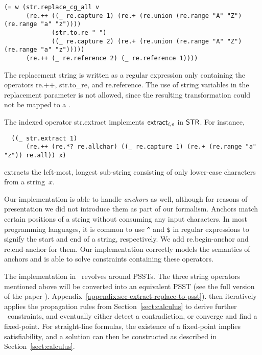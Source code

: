 {\small
\begin{verbatim}
(= w (str.replace_cg_all v
      (re.++ ((_ re.capture 1) (re.+ (re.union (re.range "A" "Z") (re.range "a" "z"))))
             (str.to.re " ") 
             ((_ re.capture 2) (re.+ (re.union (re.range "A" "Z") (re.range "a" "z")))))
      (re.++ (_ re.reference 2) (_ re.reference 1))))
\end{verbatim}
}

The replacement string is written as a regular expression only
containing the operators {\sf re.++}, {\sf str.to\_re}, and {\sf
  re.reference}. The use of string variables in the replacement
parameter is not allowed, since the resulting transformation could
not be mapped to a \PSST.

The indexed operator {\sf str.extract} implements $\mathsf{extract}_{i, e}$ in
$\mathsf{STR}$. For instance,

{\small
\begin{verbatim}
  ((_ str.extract 1)
      (re.++ (re.*? re.allchar) ((_ re.capture 1) (re.+ (re.range "a" "z")) re.all)) x)
\end{verbatim}
}

\noindent
extracts the left-most, longest sub-string consisting of only lower-case
characters from a string~$x$.

Our implementation is able to handle \textit{anchors} as well,
although for reasons of presentation we did not introduce them as part
of our formalism. Anchors match certain
positions of a string without consuming any input characters. In most
programming languages, it is common to use \verb!^!
and
\verb!$! in regular expressions to signify the start and end of a
string, respectively. We add \textsf{re.begin-anchor} and
\textsf{re.end-anchor} for them. Our implementation correctly models
the semantics of anchors and is able to solve constraints containing
these operators.

The implementation in \ostrich\ revolves around PSSTs. The three
string operators mentioned above will be converted into an equivalent
PSST (see \ifproceeding the full version of the paper \cite{popl22-full}).
\else Appendix~\ref{appendix:sec-extract-replace-to-psst}). \fi {\ostrich} then
iteratively applies the propagation rules from
Section~\ref{sect:calculus} to derive further \regexp\ constraints,
and eventually either detect a contradiction, or converge
and find a fixed-point. For straight-line formulas, the existence of a
fixed-point implies satisfiability, and a solution can then be
constructed as described in Section~\ref{sect:calculus}.

